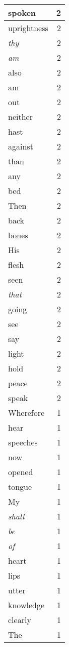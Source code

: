 \begin{center}
\begin{longtable}{l|r}
spoken & 2 \\ \hline
uprightness & 2 \\ \hline
\emph{thy} & 2 \\ \hline
\emph{am} & 2 \\ \hline
also & 2 \\ \hline
am & 2 \\ \hline
out & 2 \\ \hline
neither & 2 \\ \hline
hast & 2 \\ \hline
against & 2 \\ \hline
than & 2 \\ \hline
any & 2 \\ \hline
bed & 2 \\ \hline
Then & 2 \\ \hline
back & 2 \\ \hline
bones & 2 \\ \hline
His & 2 \\ \hline
flesh & 2 \\ \hline
seen & 2 \\ \hline
\emph{that} & 2 \\ \hline
going & 2 \\ \hline
see & 2 \\ \hline
say & 2 \\ \hline
light & 2 \\ \hline
hold & 2 \\ \hline
peace & 2 \\ \hline
speak & 2 \\ \hline
Wherefore & 1 \\ \hline
hear & 1 \\ \hline
speeches & 1 \\ \hline
now & 1 \\ \hline
opened & 1 \\ \hline
tongue & 1 \\ \hline
My & 1 \\ \hline
\emph{shall} & 1 \\ \hline
\emph{be} & 1 \\ \hline
\emph{of} & 1 \\ \hline
heart & 1 \\ \hline
lips & 1 \\ \hline
utter & 1 \\ \hline
knowledge & 1 \\ \hline
clearly & 1 \\ \hline
The & 1 \\ \hline

\end{longtable}
\end{center}

